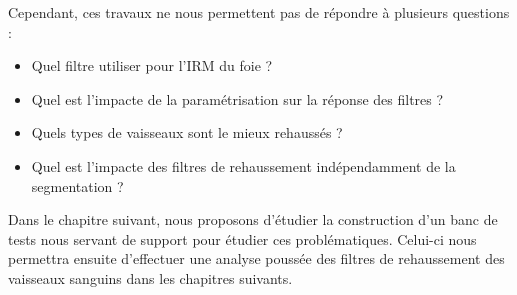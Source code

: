 Cependant, ces travaux ne nous permettent pas de répondre à plusieurs questions :

\begin{itemize}
\item Quel filtre utiliser pour l'IRM du foie ?
\item Quel est l'impacte de la paramétrisation sur la réponse des filtres ?
\item Quels types de vaisseaux sont le mieux rehaussés ?
\item Quel est l'impacte des filtres de rehaussement indépendamment de la segmentation ?
\end{itemize}

Dans le chapitre suivant, nous proposons d'étudier la construction d'un banc de tests nous servant de support pour étudier ces problématiques. Celui-ci nous permettra ensuite d'effectuer une analyse poussée des filtres de rehaussement des vaisseaux sanguins dans les chapitres suivants.